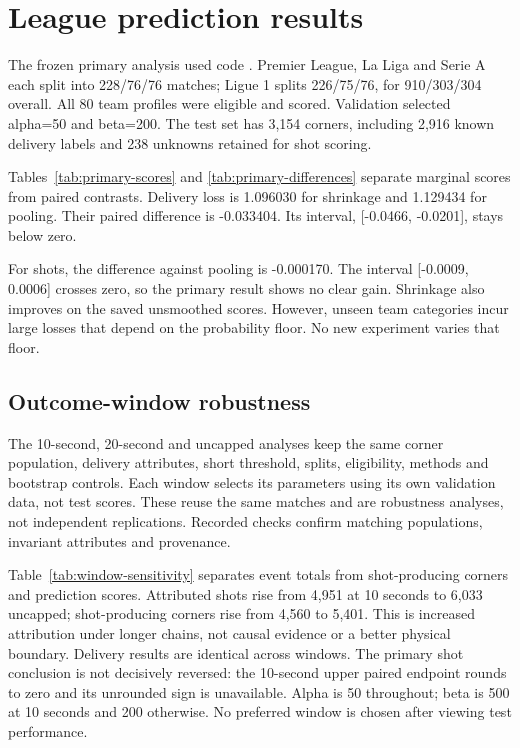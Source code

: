 \documentclass[sigconf,nonacm]{acmart}
\newcommand{\codehash}[1]{\texttt{\seqsplit{#1}}}
\begin{document}
\section{League prediction results}
The frozen primary analysis used code \codehash{6a64fbdde56131077c66d245b2cb59cad60135a0}.
Premier League, La Liga and Serie A each split into 228/\allowbreak{}76/\allowbreak{}76 matches; Ligue 1 splits
226/\allowbreak{}75/\allowbreak{}76, for 910/\allowbreak{}303/\allowbreak{}304 overall. All 80 team profiles were eligible and scored.
Validation selected alpha=50 and beta=200. The test set has 3,154 corners, including
2,916 known delivery labels and 238 unknowns retained for shot scoring.

Tables~\ref{tab:primary-scores} and \ref{tab:primary-differences} separate marginal
scores from paired contrasts. Delivery loss is 1.096030 for shrinkage and
1.129434 for pooling. Their paired difference is -0.033404. Its interval,
[-0.0466, -0.0201], stays below zero.

For shots, the difference against pooling is -0.000170. The interval
[-0.0009, 0.0006] crosses zero, so the primary result shows no clear gain.
Shrinkage also improves on the saved unsmoothed scores. However, unseen team
categories incur large losses that depend on the probability floor. No new
experiment varies that floor.



\subsection{Outcome-window robustness}
The 10-second, 20-second and uncapped analyses keep the same corner population,
delivery attributes, short threshold, splits, eligibility, methods and bootstrap
controls. Each window selects its parameters using its own validation data, not
test scores. These reuse the same matches and are robustness analyses, not
independent replications. Recorded checks confirm matching populations, invariant attributes and provenance.

Table~\ref{tab:window-sensitivity} separates event totals from shot-producing
corners and prediction scores. Attributed shots rise from 4,951 at 10 seconds to
6,033 uncapped; shot-producing corners rise from 4,560 to 5,401. This is increased
attribution under longer chains, not causal evidence or a better physical boundary.
Delivery results are identical across windows. The primary shot conclusion is not
decisively reversed: the 10-second upper paired endpoint rounds to zero and its
unrounded sign is unavailable. Alpha is 50 throughout; beta is 500 at 10 seconds
and 200 otherwise. No preferred window is chosen after viewing test performance.

\end{document}
